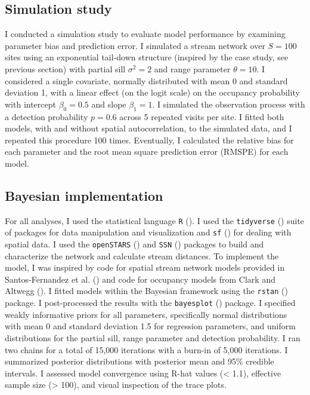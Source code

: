 \documentclass[
  11pt,
  a4paper,
]{article}
\begin{document}
\subsection{Simulation study}\label{simulation-study}

I conducted a simulation study to evaluate model performance by examining parameter bias and prediction error. I simulated a stream network over \(S = 100\) sites using an exponential tail-down structure (inspired by the case study, see previous section) with partial sill \(\sigma^2 = 2\) and range parameter \(\theta = 10\). I considered a single covariate, normally distributed with mean 0 and standard deviation 1, with a linear effect (on the logit scale) on the occupancy probability with intercept \(\beta_0 = 0.5\) and slope \(\beta_1 = 1\). I simulated the observation process with a detection probability \(p = 0.6\) across 5 repeated visits per site. I fitted both models, with and without spatial autocorrelation, to the simulated data, and I repeated this procedure 100 times. Eventually, I calculated the relative bias for each parameter and the root mean square prediction error (RMSPE) for each model.

\subsection{Bayesian implementation}\label{bayesian-implementation}

For all analyses, I used the statistical language \texttt{R} (). I used the \texttt{tidyverse} () suite of packages for data manipulation and visualization and \texttt{sf} () for dealing with spatial data. I used the \texttt{openSTARS} () and \texttt{SSN} () packages to build and characterize the network and calculate stream distances. To implement the model, I was inspired by code for spatial stream network models provided in Santos-Fernandez et al. () and code for occupancy models from Clark and Altwegg (). I fitted models within the Bayesian framework using the \texttt{rstan} () package. I post-processed the results with the \texttt{bayesplot} () package. I specified weakly informative priors for all parameters, specifically normal distributions with mean 0 and standard deviation 1.5 for regression parameters, and uniform distributions for the partial sill, range parameter and detection probability. I ran two chains for a total of 15,000 iterations with a burn-in of 5,000 iterations. I summarized posterior distributions with posterior mean and 95\% credible intervals. I assessed model convergence using R-hat values (\textless{} 1.1), effective sample size (\textgreater{} 100), and visual inspection of the trace plots.
\end{document}
